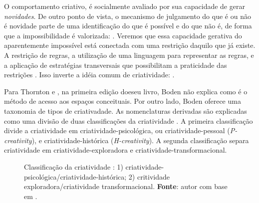 {O comportamento criativo, é socialmente avaliado por sua capacidade de gerar \emph{novidades}. De outro ponto de vista, o mecanismo de julgamento do que é ou não é novidade parte de uma identificação do que é possível e do que não é, de forma que a impossibilidade é valorizada:  . Veremos que essa capacidade gerativa do aparentemente impossível está conectada com uma restrição daquilo que já existe. A restrição de regras, a utilização de uma linguagem para representar as regras, e a aplicação de estratégias transversais que possibilitam a praticidade das restrições . Isso inverte a idéia comum de criatividade:  .

Para Thornton e , na primeira edição doeseu livro, Boden não explica como é o método de acesso aos espaços conceituais. Por outro lado, Boden oferece uma taxonomia de tipos de criativadade. As nomenclaturas derivadas são explicadas como uma divisão de duas classificações da criatividade . A primeira classificação divide a criatividade em criatividade-psicológica, ou criatividade-pessoal (\emph{P-creativity}), e criatividade-histórica (\emph{H-creativity}). A segunda classificação separa criatividade em criatividade-exploradora e criatividade-transformacional.

\begin{figure}
\centering
{}
\caption{Classificação da criatividade : 1) criatividade-psicológica/criatividade-histórica; 2) critividade exploradora/criatividade transformacional. \textbf{Fonte}: autor com base em .}
\label{fig:ortogonal}
\end{figure}

}
